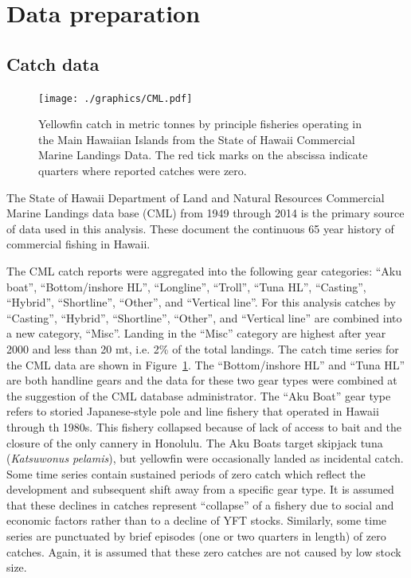 \documentclass[12pt,letterpaper]{article}
\begin{document}
\clearpage


\appendix
\section*{Data preparation}
\label{sec:data}

\subsection*{Catch data}

\begin{figure}
\begin{center}
\texttt{[image: ./graphics/CML.pdf]}
\caption{\label{fig:CMLdata}
Yellowfin catch in metric tonnes by principle fisheries operating in
the Main Hawaiian Islands from the State of Hawaii Commercial Marine
Landings Data.
The red tick marks on the abscissa indicate quarters where reported
catches were zero.
}
\end{center}
\end{figure}


The State of Hawaii Department of Land and Natural Resources
Commercial Marine Landings data base (CML) from 1949 through 2014 is
the primary source of data used in this analysis. These document the
continuous 65 year history of commercial fishing in Hawaii.


The CML catch reports were aggregated into the following gear categories:
``Aku boat'', ``Bottom/inshore HL'', ``Longline'',  ``Troll'', ``Tuna
HL'', ``Casting'', ``Hybrid'',  ``Shortline'', ``Other'', and
``Vertical line''.
For this analysis catches by ``Casting'', ``Hybrid'',
``Shortline'', ``Other'', and ``Vertical line'' are combined into a new
category, ``Misc''. Landing in the ``Misc'' category are highest after
year 2000 and less than 20 mt, i.e. 2\% of the total landings.
The catch time series for the CML data are shown in
Figure~\ref{fig:CMLdata}.
The ``Bottom/inshore HL'' and ``Tuna HL'' are both handline gears and
the data for these two gear types were combined at the suggestion of
the CML database administrator.
The ``Aku Boat'' gear type refers to storied Japanese-style pole and
line fishery that operated in Hawaii through th 1980s. This fishery
collapsed because of lack of access to bait and the closure of the only
cannery in Honolulu. The Aku Boats target skipjack tuna 
({\it Katsuwonus pelamis}), but yellowfin were occasionally landed as
incidental catch.
Some time series contain sustained periods of zero catch which
reflect the development and subsequent shift away from a specific
gear type. It is assumed that these declines in catches represent
``collapse'' of a fishery due to social and economic factors rather than
to a decline of YFT stocks.
Similarly, some time series are punctuated by brief episodes (one or two quarters in
length) of zero catches. Again, it is assumed that these zero catches
are not caused by low stock size.
\end{document}
